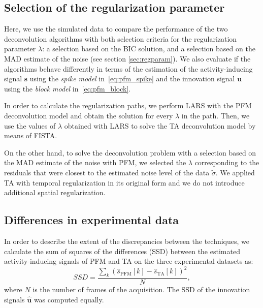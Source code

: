 \subsection{Selection of the regularization parameter}

Here, we use the simulated data to compare the performance of the two deconvolution algorithms with both selection criteria for the regularization parameter $\lambda$: a selection based on the BIC solution, and a selection based on the MAD estimate of the noise (see section \ref{sec:regparam}). We also evaluate if the algorithms behave differently in terms of the estimation of the activity-inducing signal \(\mathbf{s}\) using the \textit{spike model} in~\eqref{eq:pfm_spike} and the innovation signal \(\mathbf{u}\) using the \textit{block model} in~\eqref{eq:pfm_block}.

In order to calculate the regularization paths, we perform LARS with the PFM deconvolution model and obtain the solution for every $\lambda$ in the path. Then, we use the values of $\lambda$ obtained with LARS to solve the TA deconvolution model by means of FISTA.

On the other hand, to solve the deconvolution problem with a selection based on the MAD estimate of the noise with PFM, we selected the \(\lambda\) corresponding to the residuals that were closest to the estimated noise level of the data $\tilde{\sigma}$. We applied TA with temporal regularization in its original form and we do not introduce additional spatial regularization.

\subsection{Differences in experimental data}

In order to describe the extent of the discrepancies between the techniques, we calculate the sum of squares of the differences (SSD) between the estimated activity-inducing signals of PFM and TA on the three experimental datasets as:
\begin{equation}
    SSD = \frac{\sum_{k}{(\hat{s}_\text{PFM}[k] - \hat{s}_\text{TA}[k])^2}}{N},
\end{equation}
where \(N\) is the number of frames of the acquisition. The SSD of the innovation signals $\mathbf{\hat{u}}$ was computed equally.

